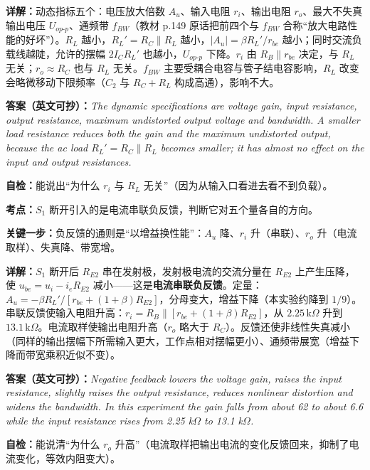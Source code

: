 \documentclass[11pt]{ctexart}
\let\origsubhdr\subhdr
\renewcommand{\subhdr}[1]{\needspace{3\baselineskip}\origsubhdr{#1}}
\begin{document}
\textbf{详解：}动态指标五个：电压放大倍数 $A_u$、输入电阻 $r_i$、输出电阻 $r_o$、最大不失真输出电压 $U_{op\text{-}p}$、通频带 $f_{BW}$（教材 p.149 原话把前四个与 $f_{BW}$ 合称“放大电路性能的好坏”）。$R_L$ 越小，$R_L'=R_C\parallel R_L$ 越小，$|A_u|=\beta R_L'/r_{be}$ 越小；同时交流负载线越陡，允许的摆幅 $2I_CR_L'$ 也越小，$U_{op\text{-}p}$ 下降。$r_i$ 由 $R_B\parallel r_{be}$ 决定，与 $R_L$ 无关；$r_o\approx R_C$ 也与 $R_L$ 无关。$f_{BW}$ 主要受耦合电容与管子结电容影响，$R_L$ 改变会略微移动下限频率（$C_2$ 与 $R_C+R_L$ 构成高通），影响不大。

\textbf{答案（英文可抄）：}\textit{The dynamic specifications are voltage gain, input resistance, output resistance, maximum undistorted output voltage and bandwidth. A smaller load resistance reduces both the gain and the maximum undistorted output, because the ac load $R_L'=R_C\parallel R_L$ becomes smaller; it has almost no effect on the input and output resistances.}

\textbf{自检：}能说出“为什么 $r_i$ 与 $R_L$ 无关”（因为从输入口看进去看不到负载）。



\textbf{考点：}$S_1$ 断开引入的是电流串联负反馈，判断它对五个量各自的方向。

\textbf{关键一步：}负反馈的通则是“以增益换性能”：$A_u$ 降、$r_i$ 升（串联）、$r_o$ 升（电流取样）、失真降、带宽增。

\textbf{详解：}$S_1$ 断开后 $R_{E2}$ 串在发射极，发射极电流的交流分量在 $R_{E2}$ 上产生压降，使 $u_{be}=u_i-i_eR_{E2}$ 减小——这是\textbf{电流串联负反馈}。定量：$A_u=-\beta R_L'/[r_{be}+(1+\beta)R_{E2}]$，分母变大，增益下降（本实验约降到 $1/9$）。串联反馈使输入电阻升高：$r_i=R_B\parallel[r_{be}+(1+\beta)R_{E2}]$，从 $2.25\,\mathrm{k}\Omega$ 升到 $13.1\,\mathrm{k}\Omega$。电流取样使输出电阻升高（$r_o$ 略大于 $R_C$）。反馈还使非线性失真减小（同样的输出摆幅下所需输入更大，工作点相对摆幅更小）、通频带展宽（增益下降而带宽乘积近似不变）。

\textbf{答案（英文可抄）：}\textit{Negative feedback lowers the voltage gain, raises the input resistance, slightly raises the output resistance, reduces nonlinear distortion and widens the bandwidth. In this experiment the gain falls from about 62 to about 6.6 while the input resistance rises from 2.25 k$\Omega$ to 13.1 k$\Omega$.}

\textbf{自检：}能说清“为什么 $r_o$ 升高”（电流取样把输出电流的变化反馈回来，抑制了电流变化，等效内阻变大）。
\end{document}
